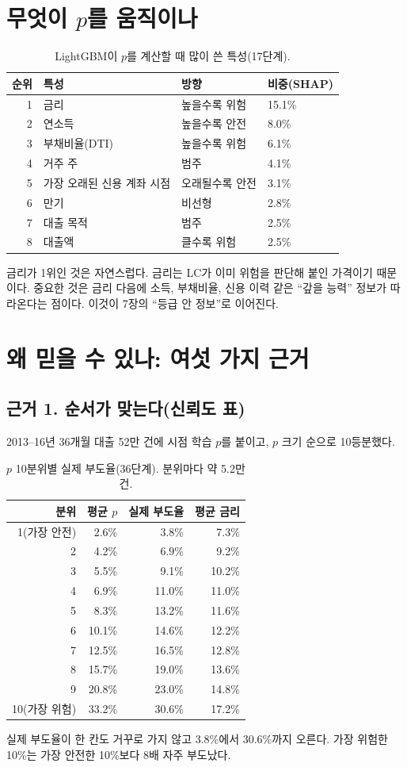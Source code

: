 \section{무엇이 $p$를 움직이나}
\begin{table}[H]\centering\small
\begin{tabular}{@{}rlll@{}}\toprule
순위 & 특성 & 방향 & 비중(SHAP)\\\midrule
1 & 금리 & 높을수록 위험 & 15.1\%\\
2 & 연소득 & 높을수록 안전 & 8.0\%\\
3 & 부채비율(DTI) & 높을수록 위험 & 6.1\%\\
4 & 거주 주 & 범주 & 4.1\%\\
5 & 가장 오래된 신용 계좌 시점 & 오래될수록 안전 & 3.1\%\\
6 & 만기 & 비선형 & 2.8\%\\
7 & 대출 목적 & 범주 & 2.5\%\\
8 & 대출액 & 클수록 위험 & 2.5\%\\\bottomrule
\end{tabular}
\caption{LightGBM이 $p$를 계산할 때 많이 쓴 특성(17단계).}
\end{table}
금리가 1위인 것은 자연스럽다. 금리는 LC가 이미 위험을 판단해 붙인 가격이기 때문이다. 중요한 것은 금리 다음에 소득, 부채비율, 신용 이력 같은 ``갚을 능력'' 정보가 따라온다는 점이다. 이것이 7장의 ``등급 안 정보''로 이어진다.

\section{왜 믿을 수 있나: 여섯 가지 근거}
\subsection*{근거 1. 순서가 맞는다(신뢰도 표)}
2013--16년 36개월 대출 52만 건에 시점 학습 $p$를 붙이고, $p$ 크기 순으로 10등분했다.

\begin{table}[H]\centering\small
\begin{tabular}{@{}rrrr@{}}\toprule
분위 & 평균 $p$ & 실제 부도율 & 평균 금리\\\midrule
1(가장 안전) & 2.6\% & 3.8\% & 7.3\%\\
2 & 4.2\% & 6.9\% & 9.2\%\\
3 & 5.5\% & 9.1\% & 10.2\%\\
4 & 6.9\% & 11.0\% & 11.0\%\\
5 & 8.3\% & 13.2\% & 11.6\%\\
6 & 10.1\% & 14.6\% & 12.2\%\\
7 & 12.5\% & 16.5\% & 12.8\%\\
8 & 15.7\% & 19.0\% & 13.6\%\\
9 & 20.8\% & 23.0\% & 14.8\%\\
10(가장 위험) & 33.2\% & 30.6\% & 17.2\%\\\bottomrule
\end{tabular}
\caption{$p$ 10분위별 실제 부도율(36단계). 분위마다 약 5.2만 건.}
\end{table}
실제 부도율이 한 칸도 거꾸로 가지 않고 3.8\%에서 30.6\%까지 오른다. 가장 위험한 10\%는 가장 안전한 10\%보다 8배 자주 부도났다.


